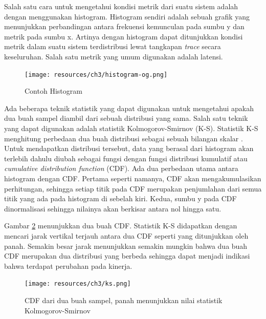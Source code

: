 Salah satu cara untuk mengetahui kondisi metrik dari suatu sistem adalah dengan menggunakan histogram. Histogram sendiri adalah sebuah grafik yang menunjukkan perbandingan antara frekuensi kemunculan pada sumbu y dan metrik pada sumbu x. Artinya dengan histogram dapat ditunjukkan kondisi metrik dalam suatu sistem terdistribusi lewat tangkapan \textit{trace} secara keseluruhan. Salah satu metrik yang umum digunakan adalah latensi.

\begin{figure}[htb]
	\centering
	\texttt{[image: resources/ch3/histogram-og.png]}
	\caption{Contoh Histogram \citep{parker2020distributed}}
	\label{histogram}
\end{figure}

Ada beberapa teknik statistik yang dapat digunakan untuk mengetahui apakah dua buah sampel diambil dari sebuah distribusi yang sama. Salah satu teknik yang dapat digunakan adalah statistik Kolmogorov-Smirnov (K-S). Statistik K-S menghitung perbedaan dua buah distribusi sebagai sebuah bilangan skalar \citep{kolmogorov_1951}. Untuk mendapatkan distribusi tersebut, data yang berasal dari histogram akan terlebih dahulu diubah sebagai fungsi dengan fungsi distribusi kumulatif atau \textit{cumulative distribution function} (CDF). Ada dua perbedaan utama antara histogram dengan CDF. Pertama seperti namanya, CDF akan mengakumulasikan perhitungan, sehingga setiap titik pada CDF merupakan penjumlahan dari semua titik yang ada pada histogram di sebelah kiri. Kedua, sumbu y pada CDF dinormalisasi sehingga nilainya akan berkisar antara nol hingga satu. 

Gambar \ref{ks-example} menunjukkan dua buah CDF. Statistik K-S didapatkan dengan mencari jarak vertikal terjauh antara dua CDF seperti yang ditunjukkan oleh panah. Semakin besar jarak menunjukkan semakin mungkin bahwa dua buah CDF merupakan dua distribusi yang berbeda sehingga dapat menjadi indikasi bahwa terdapat perubahan pada kinerja. 

\begin{figure}[htb]
	\centering
	\texttt{[image: resources/ch3/ks.png]}
	\caption{CDF dari dua buah sampel, panah menunjukkan nilai statistik Kolmogorov-Smirnov \citep{wiki:ks-test}}
	\label{ks-example}
\end{figure}

